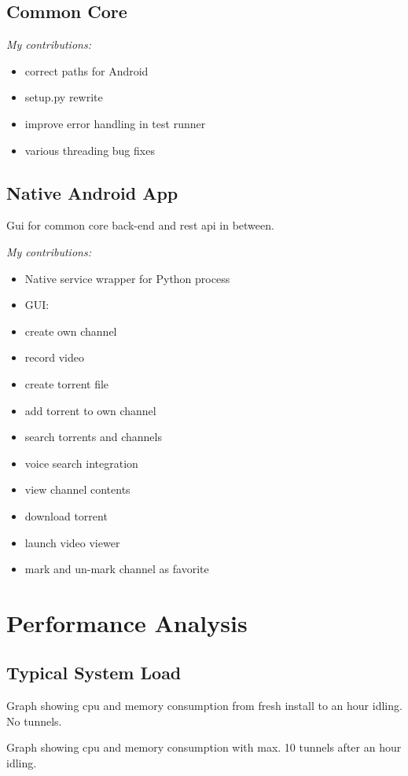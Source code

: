 \documentclass[]{report}
\begin{document}
\section{Common Core}

\emph{My contributions:}
\begin{itemize}
	\item correct paths for Android
	\item setup.py rewrite
	\item improve error handling in test runner
	\item various threading bug fixes
\end{itemize}


\section{Native Android App}
Gui for common core back-end and rest api in between.

\emph{My contributions:}
\begin{itemize}
	\item Native service wrapper for Python process
	\item GUI:
	\item create own channel
	\item record video
	\item create torrent file
	\item add torrent to own channel
	\item search torrents and channels
	\item voice search integration
	\item view channel contents
	\item download torrent
	\item launch video viewer
	\item mark and un-mark channel as favorite
\end{itemize}



\chapter{Performance Analysis}

\section{Typical System Load}
Graph showing cpu and memory consumption from fresh install to an hour idling. No tunnels.

Graph showing cpu and memory consumption with max. 10 tunnels after an hour idling.
\end{document}
